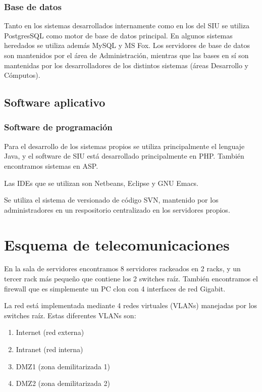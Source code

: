 \documentclass[a4paper,11pt,oneside]{article}
\begin{document}
\subsubsection*{Base de datos}
%
Tanto en los sistemas desarrollados internamente como en los del SIU
se utiliza PostgresSQL como motor de base de datos principal. En
algunos sistemas heredados se utiliza además MySQL y MS Fox.  Los
servidores de base de datos son mantenidos por el área de
Administración, mientras que las bases en sí son mantenidas por los
desarrolladores de los distintos sistemas (áreas Desarrollo y
Cómputos).
%
\subsection*{Software aplicativo}
%
\subsubsection*{Software de programación}
%
Para el desarrollo de los sistemas propios se utiliza principalmente
el lenguaje Java, y el software de SIU está desarrollado
principalmente en PHP. También encontramos sistemas en ASP.

Las IDEs que se utilizan son Netbeans, Eclipse y GNU Emacs.

Se utiliza el sistema de versionado de código SVN, mantenido por los
administradores en un respositorio centralizado en los servidores
propios.
%
\section{Esquema de telecomunicaciones}

En la sala de servidores encontramos 8 servidores rackeados en 2
racks, y un tercer rack más pequeño que contiene los 2 switches
raíz. También encontramos el firewall que es simplemente un PC clon
con 4 interfaces de red Gigabit.

La red está implementada mediante 4 redes virtuales (VLANs) manejadas por
los switches raíz. Estas diferentes VLANs son:
\begin{enumerate}
\item Internet (red externa)
\item Intranet (red interna)
\item DMZ1 (zona demilitarizada 1)
\item DMZ2 (zona demilitarizada 2)
\end{enumerate}
\end{document}
